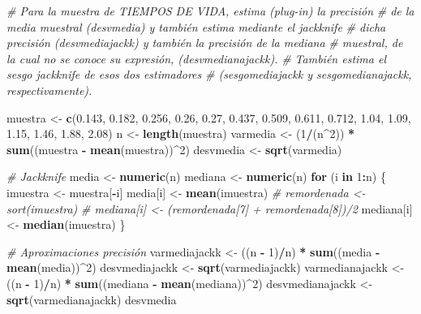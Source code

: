 \documentclass[]{book}
\newenvironment{Shaded}{\begin{snugshade}}{\end{snugshade}}
\newcommand{\KeywordTok}[1]{\textcolor[rgb]{0.13,0.29,0.53}{\textbf{#1}}}
\newcommand{\DecValTok}[1]{\textcolor[rgb]{0.00,0.00,0.81}{#1}}
\newcommand{\FloatTok}[1]{\textcolor[rgb]{0.00,0.00,0.81}{#1}}
\newcommand{\StringTok}[1]{\textcolor[rgb]{0.31,0.60,0.02}{#1}}
\newcommand{\CommentTok}[1]{\textcolor[rgb]{0.56,0.35,0.01}{\textit{#1}}}
\newcommand{\ControlFlowTok}[1]{\textcolor[rgb]{0.13,0.29,0.53}{\textbf{#1}}}
\newcommand{\OperatorTok}[1]{\textcolor[rgb]{0.81,0.36,0.00}{\textbf{#1}}}
\newcommand{\NormalTok}[1]{#1}
\theoremstyle{definition}
\theoremstyle{definition}
\theoremstyle{definition}
\theoremstyle{remark}
\begin{document}
\begin{Shaded}
\begin{Highlighting}[]
\CommentTok{# Para la muestra de TIEMPOS DE VIDA, estima (plug-in) la precisión }
\CommentTok{# de la media muestral (desvmedia) y también estima mediante el jackknife }
\CommentTok{# dicha precisión (desvmediajackk) y también la precisión de la mediana }
\CommentTok{# muestral, de la cual no se conoce su expresión, (desvmedianajackk). }
\CommentTok{# También estima el sesgo jackknife de esos dos estimadores}
\CommentTok{# (sesgomediajackk y sesgomedianajackk, respectivamente).}

\NormalTok{muestra <-}\StringTok{ }\KeywordTok{c}\NormalTok{(}\FloatTok{0.143}\NormalTok{, }\FloatTok{0.182}\NormalTok{, }\FloatTok{0.256}\NormalTok{, }\FloatTok{0.26}\NormalTok{, }\FloatTok{0.27}\NormalTok{, }\FloatTok{0.437}\NormalTok{, }\FloatTok{0.509}\NormalTok{, }
    \FloatTok{0.611}\NormalTok{, }\FloatTok{0.712}\NormalTok{, }\FloatTok{1.04}\NormalTok{, }\FloatTok{1.09}\NormalTok{, }\FloatTok{1.15}\NormalTok{, }\FloatTok{1.46}\NormalTok{, }\FloatTok{1.88}\NormalTok{, }\FloatTok{2.08}\NormalTok{)}
\NormalTok{n <-}\StringTok{ }\KeywordTok{length}\NormalTok{(muestra)}
\NormalTok{varmedia <-}\StringTok{ }\NormalTok{(}\DecValTok{1}\OperatorTok{/}\NormalTok{(n}\OperatorTok{^}\DecValTok{2}\NormalTok{)) }\OperatorTok{*}\StringTok{ }\KeywordTok{sum}\NormalTok{((muestra }\OperatorTok{-}\StringTok{ }\KeywordTok{mean}\NormalTok{(muestra))}\OperatorTok{^}\DecValTok{2}\NormalTok{)}
\NormalTok{desvmedia <-}\StringTok{ }\KeywordTok{sqrt}\NormalTok{(varmedia)}

\CommentTok{# Jackknife}
\NormalTok{media <-}\StringTok{ }\KeywordTok{numeric}\NormalTok{(n)}
\NormalTok{mediana <-}\StringTok{ }\KeywordTok{numeric}\NormalTok{(n)}
\ControlFlowTok{for}\NormalTok{ (i }\ControlFlowTok{in} \DecValTok{1}\OperatorTok{:}\NormalTok{n) \{}
\NormalTok{    imuestra <-}\StringTok{ }\NormalTok{muestra[}\OperatorTok{-}\NormalTok{i]}
\NormalTok{    media[i] <-}\StringTok{ }\KeywordTok{mean}\NormalTok{(imuestra)}
    \CommentTok{# remordenada <- sort(imuestra)}
    \CommentTok{# mediana[i] <- (remordenada[7] + remordenada[8])/2}
\NormalTok{    mediana[i] <-}\StringTok{ }\KeywordTok{median}\NormalTok{(imuestra)}
\NormalTok{\}}

\CommentTok{# Aproximaciones precisión}
\NormalTok{varmediajackk <-}\StringTok{ }\NormalTok{((n }\OperatorTok{-}\StringTok{ }\DecValTok{1}\NormalTok{)}\OperatorTok{/}\NormalTok{n) }\OperatorTok{*}\StringTok{ }\KeywordTok{sum}\NormalTok{((media }\OperatorTok{-}\StringTok{ }\KeywordTok{mean}\NormalTok{(media))}\OperatorTok{^}\DecValTok{2}\NormalTok{)}
\NormalTok{desvmediajackk <-}\StringTok{ }\KeywordTok{sqrt}\NormalTok{(varmediajackk)}
\NormalTok{varmedianajackk <-}\StringTok{ }\NormalTok{((n }\OperatorTok{-}\StringTok{ }\DecValTok{1}\NormalTok{)}\OperatorTok{/}\NormalTok{n) }\OperatorTok{*}\StringTok{ }\KeywordTok{sum}\NormalTok{((mediana }\OperatorTok{-}\StringTok{ }\KeywordTok{mean}\NormalTok{(mediana))}\OperatorTok{^}\DecValTok{2}\NormalTok{)}
\NormalTok{desvmedianajackk <-}\StringTok{ }\KeywordTok{sqrt}\NormalTok{(varmedianajackk)}
\NormalTok{desvmedia}
\end{Highlighting}
\end{Shaded}
\end{document}
